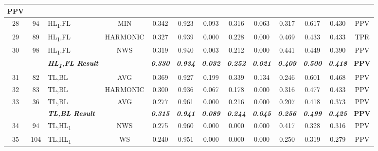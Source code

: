 \begin{table}[H]
{\begin{tabular}{cc|l|c|c|c|c|c|c|c|c|c|c|}
    \textbf{PPV} \\ \hline
  \multicolumn{1}{|c|}{28} &
    94 &
    HL\textsubscript{1},FL &
    MIN &
    0.342 &
    0.923 &
    0.093 &
    0.316 &
    0.063 &
    0.317 &
    0.617 &
    0.430 &
    PPV \\ \hline
  \multicolumn{1}{|c|}{29} &
    89 &
    HL\textsubscript{1},FL &
    HARMONIC &
    0.327 &
    0.939 &
    0.000 &
    0.228 &
    0.000 &
    0.469 &
    0.433 &
    0.433 &
    TPR \\ \hline
  \multicolumn{1}{|c|}{30} &
    98 &
    HL\textsubscript{1},FL &
    NWS &
    0.319 &
    0.940 &
    0.003 &
    0.212 &
    0.000 &
    0.441 &
    0.449 &
    0.390 &
    PPV \\ \hline
   &
    \textit{\textbf{}} &
    \textit{\textbf{HL\textsubscript{1},FL Result}} &
     &
    \textit{\textbf{0.330}} &
    \textit{\textbf{0.934}} &
    \textit{\textbf{0.032}} &
    \textit{\textbf{0.252}} &
    \textit{\textbf{0.021}} &
    \textit{\textbf{0.409}} &
    \textit{\textbf{0.500}} &
    \textit{\textbf{0.418}} &
    \textbf{PPV} \\ \hline
  \multicolumn{1}{|c|}{31} &
    82 &
    TL,BL &
    AVG &
    0.369 &
    0.927 &
    0.199 &
    0.339 &
    0.134 &
    0.246 &
    0.601 &
    0.468 &
    PPV \\ \hline
  \multicolumn{1}{|c|}{32} &
    83 &
    TL,BL &
    HARMONIC &
    0.300 &
    0.936 &
    0.067 &
    0.178 &
    0.000 &
    0.316 &
    0.477 &
    0.433 &
    PPV \\ \hline
  \multicolumn{1}{|c|}{33} &
    36 &
    TL,BL &
    AVG &
    0.277 &
    0.961 &
    0.000 &
    0.216 &
    0.000 &
    0.207 &
    0.418 &
    0.373 &
    PPV \\ \hline
   &
    \textit{\textbf{}} &
    \textit{\textbf{TL,BL Result}} &
     &
    \textit{\textbf{0.315}} &
    \textit{\textbf{0.941}} &
    \textit{\textbf{0.089}} &
    \textit{\textbf{0.244}} &
    \textit{\textbf{0.045}} &
    \textit{\textbf{0.256}} &
    \textit{\textbf{0.499}} &
    \textit{\textbf{0.425}} &
    \textbf{PPV} \\ \hline
  \multicolumn{1}{|c|}{34} &
    94 &
    TL,HL\textsubscript{1} &
    NWS &
    0.275 &
    0.960 &
    0.000 &
    0.000 &
    0.000 &
    0.417 &
    0.328 &
    0.316 &
    PPV \\ \hline
    \multicolumn{1}{|c|}{35} &
    104 &
    TL,HL\textsubscript{1} &
    WS &
    0.240 &
    0.951 &
    0.000 &
    0.000 &
    0.000 &
    0.250 &
    0.319 &
    0.279 &
    PPV \\ \hline
  \end{tabular}%
  }
  \end{table}

